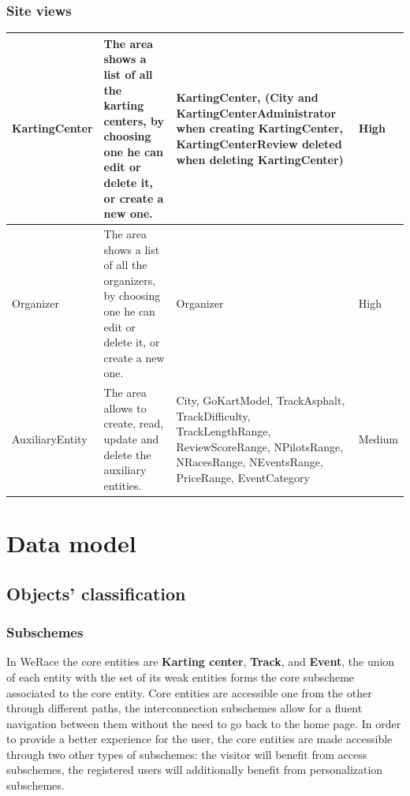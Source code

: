 \documentclass{beamer}
\newcommand{\kc}{WeRace}
\begin{document}
\begin{frame}
    \frametitle{Site views}
    \begin{table}
        \centering
        \tiny
        \setlength{\tabcolsep}{1pt}
        \begin{tabular}{|m{2cm}|m{4cm}|m{3cm}|m{1cm}|}
        \hline
        KartingCenter & The area shows a list of all the karting centers,
        by choosing one he can edit or delete it, or create a new one.
         & KartingCenter, (City and KartingCenterAdministrator when creating KartingCenter, KartingCenterReview 
        deleted when deleting KartingCenter) & High \\
        \hline
        Organizer & The area shows a list of all the organizers,
        by choosing one he can edit or delete it, or create a new one.
         & Organizer & High \\
        \hline
        AuxiliaryEntity & The area allows to create, read, update and delete the auxiliary entities.
         & City, GoKartModel, 
        TrackAsphalt, TrackDifficulty, TrackLengthRange, ReviewScoreRange, NPilotsRange, NRacesRange, NEventsRange, PriceRange, EventCategory & Medium \\
        \hline
        \end{tabular}
    \end{table}
\end{frame}

\section{Data model}

\subsection{Objects' classification}

\begin{frame}
    \frametitle{Subschemes}
    In \kc{} the core entities are \textbf{Karting center}, \textbf{Track}, and \textbf{Event},
    the union of each entity with the set of its weak entities forms the core subscheme associated to the core entity. 
    Core entities are accessible one from the other through different paths, the interconnection subschemes
    allow for a fluent navigation between them without the need to go back to the home page.  
    In order to provide a better experience for the user, the core entities are made accessible through
    two other types of subschemes: the visitor will benefit from access subschemes, the registered users will additionally
    benefit from personalization subschemes.
\end{frame}
\end{document}
